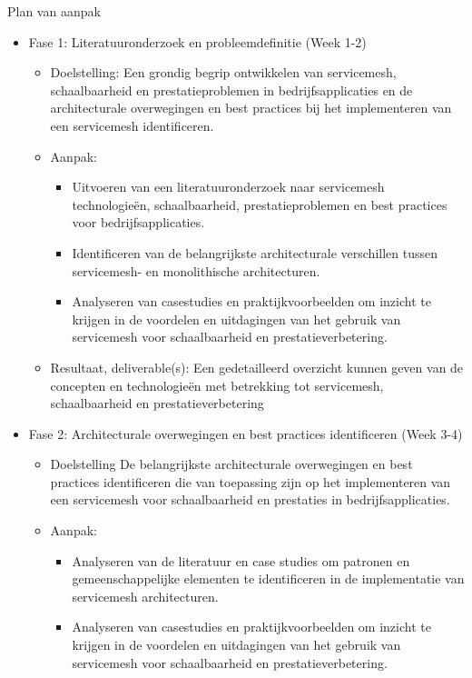 Plan van aanpak
\begin{itemize}

    \item Fase 1: Literatuuronderzoek en probleemdefinitie (Week 1-2)
    \begin{itemize}
        \item Doelstelling: Een grondig begrip ontwikkelen van servicemesh, schaalbaarheid en prestatieproblemen in bedrijfsapplicaties en de architecturale overwegingen en best practices bij het implementeren van een servicemesh identificeren.
        \item Aanpak:
        \begin{itemize}
            \item Uitvoeren van een literatuuronderzoek naar servicemesh technologieën, schaalbaarheid, prestatieproblemen en best practices voor bedrijfsapplicaties.
            \item Identificeren van de belangrijkste architecturale verschillen tussen \linebreak servicemesh- en monolithische architecturen.
            \item Analyseren van casestudies en praktijkvoorbeelden om inzicht te krijgen in de voordelen en uitdagingen van het gebruik van servicemesh voor schaalbaarheid en prestatieverbetering.
        \end{itemize}        
        \item Resultaat, deliverable(s): Een gedetailleerd overzicht kunnen geven van de concepten en technologieën met betrekking tot servicemesh, schaalbaarheid en prestatieverbetering
    \end{itemize}            
    \item Fase 2: Architecturale overwegingen en best practices identificeren (Week 3-4)
    \begin{itemize}
        \item Doelstelling De belangrijkste architecturale overwegingen en best practices identificeren die van toepassing zijn op het implementeren van een servicemesh voor schaalbaarheid en prestaties in bedrijfsapplicaties.
        \item Aanpak: 
        \begin{itemize}        
            \item Analyseren van de literatuur en case studies om patronen en gemeenschappelijke elementen te identificeren in de implementatie van \linebreak servicemesh architecturen.
            \item Analyseren van casestudies en praktijkvoorbeelden om inzicht te krijgen in de voordelen en uitdagingen van het gebruik van servicemesh voor schaalbaarheid en prestatieverbetering.

\end{itemize}
\end{itemize}
\end{itemize}
